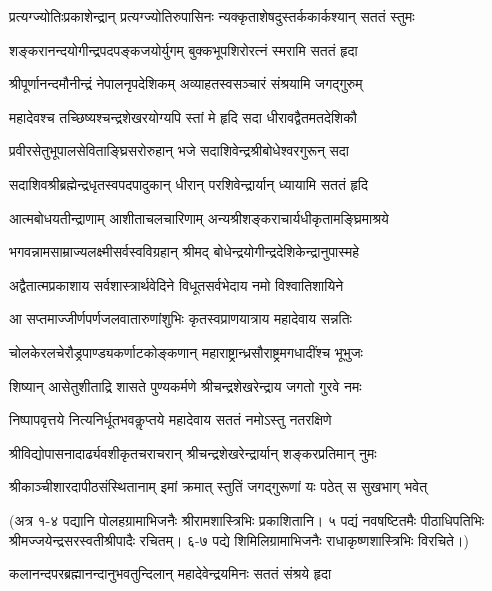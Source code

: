 \twolineshloka
{प्रत्यग्ज्योतिःप्रकाशेन्द्रान् प्रत्यग्ज्योतिरुपासिनः}
{न्यक्कृताशेषदुस्तर्ककार्कश्यान् सततं स्तुमः}%

\twolineshloka
{शङ्करानन्दयोगीन्द्रपदपङ्कजयोर्युगम्}
{बुक्कभूपशिरोरत्नं स्मरामि सततं हृदा}%

\twolineshloka
{श्रीपूर्णानन्दमौनीन्द्रं नेपालनृपदेशिकम्}
{अव्याहतस्वसञ्चारं संश्रयामि जगद्गुरुम्}%

\twolineshloka
{महादेवश्च तच्छिष्यश्चन्द्रशेखरयोग्यपि}
{स्तां मे हृदि सदा धीरावद्वैतमतदेशिकौ}%

\twolineshloka
{प्रवीरसेतुभूपालसेविताङ्घ्रिसरोरुहान्}
{भजे सदाशिवेन्द्रश्रीबोधेश्वरगुरून् सदा}%

\twolineshloka
{सदाशिवश्रीब्रह्मेन्द्रधृतस्वपदपादुकान्}
{धीरान् परशिवेन्द्रार्यान् ध्यायामि सततं हृदि}%

\twolineshloka
{आत्मबोधयतीन्द्राणाम् आशीताचलचारिणाम्}
{अन्यश्रीशङ्कराचार्यधीकृतामङ्घ्रिमाश्रये}%

\twolineshloka
{भगवन्नामसाम्राज्यलक्ष्मीसर्वस्वविग्रहान्}
{श्रीमद् बोधेन्द्रयोगीन्द्रदेशिकेन्द्रानुपास्महे}%

\twolineshloka
{अद्वैतात्मप्रकाशाय सर्वशास्त्रार्थवेदिने}
{विधूतसर्वभेदाय नमो विश्वातिशायिने}%

\twolineshloka
{आ सप्तमाज्जीर्णपर्णजलवातारुणांशुभिः}
{कृतस्वप्राणयात्राय महादेवाय सन्नतिः}%

\twolineshloka
{चोलकेरलचेरौड्रपाण्ड्यकर्णाटकोङ्कणान्}
{महाराष्ट्रान्ध्रसौराष्ट्रमगधादींश्च भूभुजः}%

\twolineshloka
{शिष्यान् आसेतुशीताद्रि शासते पुण्यकर्मणे}
{श्रीचन्द्रशेखरेन्द्राय जगतो गुरवे नमः}%

\twolineshloka
{निष्पापवृत्तये नित्यनिर्धूतभवकॢप्तये}
{महादेवाय सततं नमोऽस्तु नतरक्षिणे}%

\twolineshloka
{श्रीविद्योपासनादार्ढ्यवशीकृतचराचरान्}
{श्रीचन्द्रशेखरेन्द्रार्यान् शङ्करप्रतिमान् नुमः}%

\twolineshloka
{श्रीकाञ्चीशारदापीठसंस्थितानाम् इमां क्रमात्}
{स्तुतिं जगद्गुरूणां यः पठेत् स सुखभाग् भवेत्}%

\medskip


(अत्र १-४ पद्यानि पोलहग्रामाभिजनैः श्रीरामशास्त्रिभिः प्रकाशितानि। ५ पद्यं नवषष्टितमैः पीठाधिपतिभिः श्रीमज्जयेन्द्रसरस्वतीश्रीपादैः रचितम्। ६-७ पद्ये शिमिलिग्रामाभिजनैः राधाकृष्णशास्त्रिभिः विरचिते।)


\twolineshloka
{कलानन्दपरब्रह्मानन्दानुभवतुन्दिलान्}
{महादेवेन्द्रयमिनः सततं संश्रये हृदा}%

